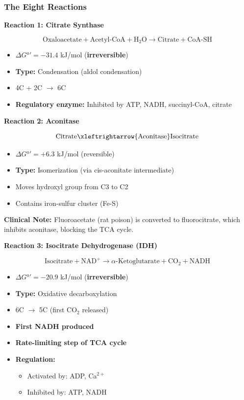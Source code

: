 \subsubsection{The Eight Reactions}

\textbf{Reaction 1: Citrate Synthase}

\[
\text{Oxaloacetate} + \text{Acetyl-CoA} + \text{H}_2\text{O} \rightarrow \text{Citrate} + \text{CoA-SH}
\]

\begin{itemize}
    \item $\Delta G°' = -31.4$ kJ/mol (\textbf{irreversible})
    \item \textbf{Type:} Condensation (aldol condensation)
    \item 4C + 2C $\rightarrow$ 6C
    \item \textbf{Regulatory enzyme:} Inhibited by ATP, NADH, succinyl-CoA, citrate
\end{itemize}

\textbf{Reaction 2: Aconitase}

\[
\text{Citrate} \xleftrightarrow{\text{Aconitase}} \text{Isocitrate}
\]

\begin{itemize}
    \item $\Delta G°' = +6.3$ kJ/mol (reversible)
    \item \textbf{Type:} Isomerization (via cis-aconitate intermediate)
    \item Moves hydroxyl group from C3 to C2
    \item Contains iron-sulfur cluster (Fe-S)
\end{itemize}

\begin{clinmark}
\textbf{Clinical Note:} Fluoroacetate (rat poison) is converted to fluorocitrate, which inhibits aconitase, blocking the TCA cycle.
\end{clinmark}

\textbf{Reaction 3: Isocitrate Dehydrogenase (IDH)}

\[
\text{Isocitrate} + \text{NAD}^+ \rightarrow \alpha\text{-Ketoglutarate} + \text{CO}_2 + \text{NADH}
\]

\begin{itemize}
    \item $\Delta G°' = -20.9$ kJ/mol (\textbf{irreversible})
    \item \textbf{Type:} Oxidative decarboxylation
    \item 6C $\rightarrow$ 5C (first CO$_2$ released)
    \item \textbf{First NADH produced}
    \item \textbf{Rate-limiting step of TCA cycle}
    \item \textbf{Regulation:}
    \begin{itemize}
        \item Activated by: ADP, Ca$^{2+}$
        \item Inhibited by: ATP, NADH
    \end{itemize}
\end{itemize}

